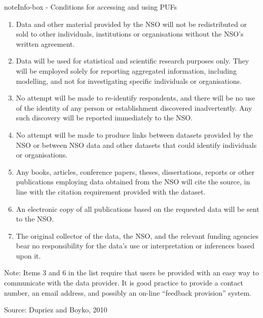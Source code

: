 \documentclass[letterpaper,10pt,english]{sphinxmanual}
\begin{document}
\begin{sphinxadmonition}{note}{Info-box - Conditions for accessing and using PUFs}
\begin{enumerate}
\item {} 
Data and other material provided by the NSO will not be redistributed or sold to other individuals, institutions or organisations without the NSO’s written agreement.

\item {} 
Data will be used for statistical and scientific research purposes only. They will be employed solely for reporting aggregated information, including modelling, and not for investigating specific individuals or organisations.

\item {} 
No attempt will be made to re-identify respondents, and there will be no use of the identity of any person or establishment discovered inadvertently. Any such discovery will be reported immediately to the NSO.

\item {} 
No attempt will be made to produce links between datasets provided by the NSO or between NSO data and other datasets that could identify individuals or organisations.

\item {} 
Any books, articles, conference papers, theses, dissertations, reports or other publications employing data obtained from the NSO will cite the source, in line with the citation requirement provided with the dataset.

\item {} 
An electronic copy of all publications based on the requested data will be sent to the NSO.

\item {} 
The original collector of the data, the NSO, and the relevant funding agencies bear no responsibility for the data’s use or interpretation or inferences based upon it.

\end{enumerate}

Note: Items 3 and 6 in the list require that users be provided with an easy way to communicate with the data provider. It is good practice to provide a contact number, an email address, and possibly an on-line “feedback provision” system.

Source: Dupriez and Boyko, 2010
\end{sphinxadmonition}
\end{document}
